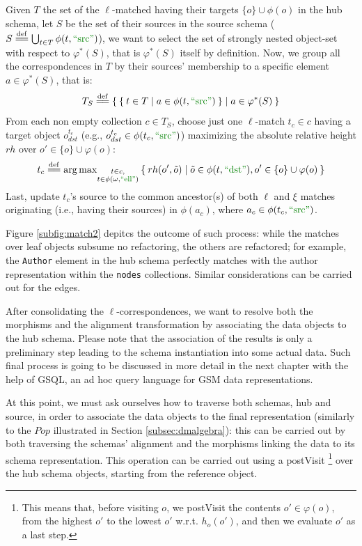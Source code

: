 \begin{example}[continues=ex:examplegraphdata,label=ex:examplereferencedOcaml]
\begin{itemize}
	Given $T$ the set of the $\ell$-matched having their targets $\{o\}\cup\phi(o)$ in the hub schema, let $S$ be the set of their sources in the source schema ($S\eqdef \bigcup_{t\in T}\phi(t,\mstr{src})$), we want to select the set of strongly nested object-set with respect to $\varphi^*(S)$, that is $\varphi^*(S)$ itself by definition. Now, we group all the correspondences in $T$ by their sources' membership to a specific element $a\in\varphi^*(S)$, that is:
	\[T_S\eqdef \Set{\Set{t\in T|a\in\phi(t,\mstr{src})}|a\in\varphi^*(S)}\]
	From each non empty collection $c\in T_S$, choose just one $\ell$-match $t_c\in c$ having a target object $o_{dst}^{t_c}$ (e.g., $o_{dst}^{t_c}\in\phi(t_c,\mstr{src})$) maximizing the absolute relative height $rh$ over $o'\in\{o\}\cup\varphi(o)$:
	\[t_c\eqdef \argmax_{\substack{t\in c,\\ t\in\phi(\omega,\mstr{ell})}}\Set{rh(o',\tilde{o})|\tilde{o}\in\phi(t,\mstr{dst}),o'\in\{o\}\cup\varphi(o)}\]
	Last, update $t_c$'s source to the common ancestor(s) of both $\ell$ and $\xi$ matches originating (i.e., having their sources) in $\phi(a_c)$, where  $a_c\in\phi(t_c,\mstr{src})$.


\end{itemize}
Figure \ref{subfig:match2} depitcs the outcome of such process: while the matches over leaf objects subsume no refactoring, the others are refactored; for example, the \texttt{Author} element in the hub schema perfectly matches with the author representation within the \texttt{nodes} collections. Similar considerations can be carried out for the edges.

After consolidating the $\ell$-correspondences, we want to resolve both the morphisms and the alignment transformation by associating the data objects to the hub schema. Please note that the association of the results is only a preliminary step leading to the schema instantiation into some actual data. Such final process  { is going to be discussed in more detail in the next chapter with the help of GSQL, an ad hoc query language for GSM data representations}. 

At this point, we must ask ourselves how to traverse both schemas,  hub and source, in order to associate the data objects to the final representation (similarly to the $Pop$ illustrated in Section \vref{subsec:dmalgebra}): this can be carried out by both traversing the schemas' alignment and the morphisms linking the data to its schema representation. This operation can be carried out using a postVisit \footnote{This means that, before visiting $o$, we postVisit the contents $o'\in\varphi(o)$, from the highest $o'$ to the lowest $o'$ w.r.t. $h_o(o')$, and then we evaluate $o'$ as a last step.} over the hub schema objects, starting from the reference object. 


\end{example}
